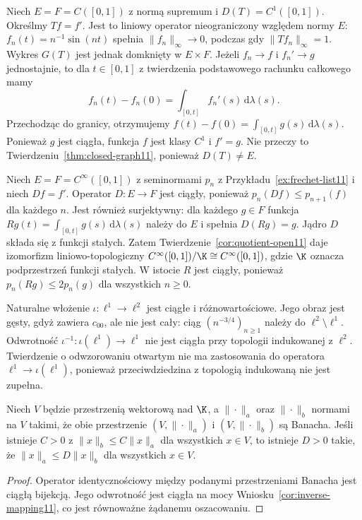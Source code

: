 \begin{przyklad}
\label{ex:closed-derivative11}
Niech $E=F=C([0,1])$ z normą supremum i
$D(T)=C^1([0,1])$. Określmy $Tf=f'$. Jest to liniowy
operator nieograniczony względem normy $E$:
$f_n(t)=n^{-1}\sin(nt)$ spełnia $\|f_n\|_\infty\to0$,
podczas gdy $\|Tf_n\|_\infty=1$.
Wykres $G(T)$ jest jednak domknięty w $E\times F$.
Jeżeli $f_n\to f$ i $f_n'\to g$ jednostajnie,
to dla $t\in[0,1]$ z twierdzenia podstawowego rachunku
całkowego mamy
\[
 f_n(t)-f_n(0)=\int_{[0,t]}f_n'(s)\,\mathrm d\lambda(s).
\]
Przechodząc do granicy, otrzymujemy
$f(t)-f(0)=\int_{[0,t]}g(s)\,\mathrm d\lambda(s)$.
Ponieważ $g$ jest ciągła, funkcja $f$ jest klasy $C^1$
i $f'=g$. Nie przeczy to Twierdzeniu~\ref{thm:closed-graph11},
ponieważ $D(T)\ne E$.
\end{przyklad}

\begin{przyklad}
\label{ex:frechet-derivative11}
Niech $E=F=C^\infty([0,1])$ z seminormami $p_n$
z Przykładu~\ref{ex:frechet-list11} i niech $Df=f'$.
Operator $D:E\to F$ jest ciągły, ponieważ
$p_n(Df)\le p_{n+1}(f)$ dla każdego $n$.
Jest również surjektywny: dla każdego $g\in F$ funkcja
$Rg(t)=\int_{[0,t]}g(s)\,\mathrm d\lambda(s)$ należy do $E$
i spełnia $D(Rg)=g$. Jądro $D$ składa się z funkcji stałych.
Zatem Twierdzenie~\ref{cor:quotient-open11} daje
izomorfizm liniowo-topologiczny
$C^\infty([0,1])/\K\cong C^\infty([0,1])$,
gdzie $\K$ oznacza podprzestrzeń funkcji stałych.
W istocie $R$ jest ciągły, ponieważ
$p_n(Rg)\le 2p_n(g)$ dla wszystkich $n\ge0$.
\end{przyklad}

\begin{przyklad}
\label{ex:dense-range11}
Naturalne włożenie $\iota:\ell^1\to\ell^2$ jest
ciągłe i różnowartościowe. Jego obraz jest gęsty, gdyż
zawiera $c_{00}$, ale nie jest cały: ciąg
$(n^{-3/4})_{n\ge1}$ należy do $\ell^2\setminus\ell^1$.
Odwrotność $\iota^{-1}:\iota(\ell^1)\to\ell^1$
nie jest ciągła przy topologii indukowanej z $\ell^2$.
Twierdzenie o odwzorowaniu otwartym nie ma zastosowania
do operatora $\ell^1\to\iota(\ell^1)$, ponieważ
przeciwdziedzina z topologią indukowaną nie jest zupełna.
\end{przyklad}

\begin{wniosek}
\label{cor:two-banach-norms11}
Niech $V$ będzie przestrzenią wektorową nad $\K$,
a $\|\cdot\|_a$ oraz $\|\cdot\|_b$ normami na $V$
takimi, że obie przestrzenie $(V,\|\cdot\|_a)$ i
$(V,\|\cdot\|_b)$ są Banacha. Jeśli istnieje $C>0$
z $\|x\|_b\le C\|x\|_a$ dla wszystkich $x\in V$,
to istnieje $D>0$ takie, że
$\|x\|_a\le D\|x\|_b$ dla wszystkich $x\in V$.
\end{wniosek}
\begin{proof}
Operator identycznościowy między podanymi przestrzeniami
Banacha jest ciągłą bijekcją. Jego odwrotność jest ciągła
na mocy Wniosku~\ref{cor:inverse-mapping11}, co jest
równoważne żądanemu oszacowaniu.
\end{proof}

